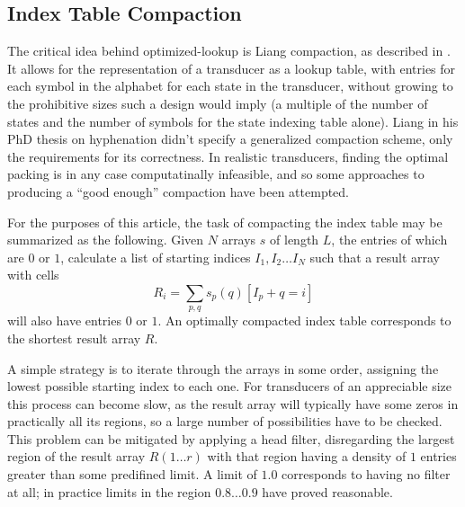 \documentclass{llncs}
\begin{document}
\subsection{Index Table Compaction}
The critical idea behind optimized-lookup is Liang compaction, as described in
\cite{silfverberg/2009}. It allows for the representation of a transducer as
a lookup table, with entries for each symbol in the alphabet for each state
in the transducer, without growing to the prohibitive sizes such a design
would imply (a multiple of the number of states and the number of symbols for
the state indexing table alone). Liang in his PhD thesis on hyphenation
\cite{liang/1983} didn't specify a generalized compaction scheme, only the
requirements for its correctness. In realistic transducers, finding the optimal
packing is in any case computatinally infeasible, and so some approaches to
producing a ``good enough'' compaction have been attempted.

For the purposes of this article, the task of compacting the index table may
be summarized as the following. Given $N$ arrays $s$ of length $L$, the
entries of which are $0$ or $1$, calculate a list of starting indices
$I_1, I_2 \ldots I_N$ such that a result array with cells
\begin{equation}
R_i = \displaystyle\sum\limits_{p, q} s_p(q) [I_p + q = i]
\end{equation} will also have
entries $0$ or $1$. An optimally compacted index table corresponds to the
shortest result array $R$.

A simple strategy is to iterate through the arrays in some order, assigning
the lowest possible starting index to each one. For transducers of an
appreciable size this process can become slow, as the result array
will typically have some zeros in practically all its regions, so a large
number of possibilities have to be checked. This problem can be mitigated by
applying a head filter, disregarding the largest region of the result array
$R(1 \ldots r)$ with that region having a density of $1$ entries greater than
some predifined limit. A limit of $1.0$ corresponds to having no filter at all;
in practice limits in the region $0.8 \ldots 0.9$ have proved reasonable.
\end{document}
